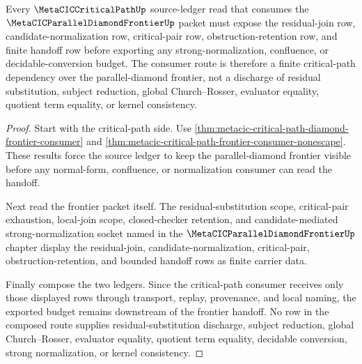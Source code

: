 \begin{theorem}
\label{thm:metacic-critical-path-parallel-diamond-frontier-consumer}
Every $\MetaCICCriticalPathUp$ source-ledger read that consumes the $\MetaCICParallelDiamondFrontierUp$ packet must expose the residual-join row, candidate-normalization row, critical-pair row, obstruction-retention row, and finite handoff row before exporting any strong-normalization, confluence, or decidable-conversion budget. The consumer route is therefore a finite critical-path dependency over the parallel-diamond frontier, not a discharge of residual substitution, subject reduction, global Church--Rosser, evaluator equality, quotient term equality, or kernel consistency.
\end{theorem}
\begin{proof}
Start with the critical-path side. Use \autoref{thm:metacic-critical-path-diamond-frontier-consumer} and \autoref{thm:metacic-critical-path-frontier-consumer-nonescape}. These results force the source ledger to keep the parallel-diamond frontier visible before any normal-form, confluence, or normalization consumer can read the handoff.

Next read the frontier packet itself. The residual-substitution scope, critical-pair exhaustion, local-join scope, closed-checker retention, and candidate-mediated strong-normalization socket named in the $\MetaCICParallelDiamondFrontierUp$ chapter display the residual-join, candidate-normalization, critical-pair, obstruction-retention, and bounded handoff rows as finite carrier data.

Finally compose the two ledgers. Since the critical-path consumer receives only those displayed rows through transport, replay, provenance, and local naming, the exported budget remains downstream of the frontier handoff. No row in the composed route supplies residual-substitution discharge, subject reduction, global Church--Rosser, evaluator equality, quotient term equality, decidable conversion, strong normalization, or kernel consistency.
\end{proof}

